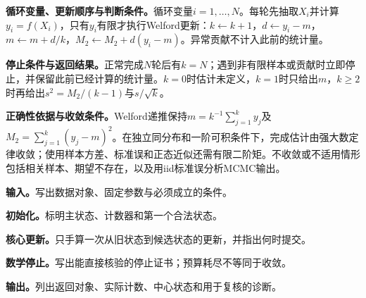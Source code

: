 \label{struct:V5-C02-CH23}
\textbf{循环变量、更新顺序与判断条件。}循环变量$i=1,\ldots,N$。每轮先抽取$X_i$并计算$y_i=f(X_i)$，只有$y_i$有限才执行Welford更新：$k\leftarrow k+1$，$d\leftarrow y_i-m$，$m\leftarrow m+d/k$，$M_2\leftarrow M_2+d(y_i-m)$。异常贡献不计入此前的统计量。

\label{struct:V5-C02-CH24}
\textbf{停止条件与返回结果。}正常完成$N$轮后有$k=N$；遇到非有限样本或贡献时立即停止，并保留此前已经计算的统计量。$k=0$时估计未定义，$k=1$时只给出$m$，$k\ge2$时再给出$s^2=M_2/(k-1)$与$s/\sqrt{k}$。

\label{struct:V5-C02-CH25}
\textbf{正确性依据与收敛条件。}Welford递推保持$m=k^{-1}\sum_{j=1}^ky_j$及$M_2=\sum_{j=1}^k(y_j-m)^2$。在独立同分布和一阶可积条件下，完成估计由强大数定律收敛；使用样本方差、标准误和正态近似还需有限二阶矩。不收敛或不适用情形包括相关样本、期望不存在，以及用iid标准误分析MCMC输出。

\begingroup
{}

\begin{keypointbox}[title={独立蒙特卡罗均值与Welford在线诊断：五步阅读}]
\textbf{输入。}写出数据对象、固定参数与必须成立的条件。\par
\textbf{初始化。}标明主状态、计数器和第一个合法状态。\par
\textbf{核心更新。}只手算一次从旧状态到候选状态的更新，并指出何时提交。\par
\textbf{数学停止。}写出能直接核验的停止证书；预算耗尽不等同于收敛。\par
\textbf{输出。}列出返回对象、实际计数、中心状态和用于复核的诊断。
\end{keypointbox}

